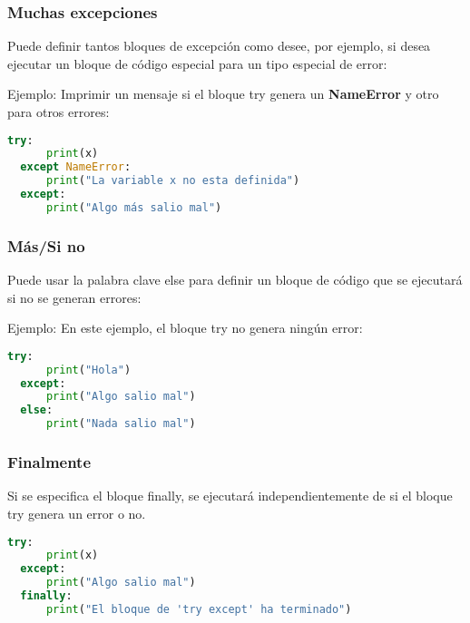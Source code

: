 \begin{frame}[fragile]
  \frametitle{Muchas excepciones}

  Puede definir tantos bloques de excepción como desee, por ejemplo,
  si desea ejecutar un bloque de código especial para un tipo especial
  de error:

  \vspace{\baselineskip}
  Ejemplo: Imprimir un mensaje si el bloque try genera un
  \textbf{NameError} y otro para otros errores:
  \begin{lstlisting}[language=Python]
  try:
      print(x)
  except NameError:
      print("La variable x no esta definida")
  except:
      print("Algo más salio mal") 
  \end{lstlisting}
\end{frame}

\begin{frame}[fragile]
  \frametitle{Más/Si no}

  Puede usar la palabra clave \textcolor{codeKeyword2}{else}
  para definir un bloque de código que se ejecutará si no se generan errores:

  \vspace{\baselineskip}
  Ejemplo: En este ejemplo, el bloque \textcolor{codeKeyword2}{try}
  no genera ningún error:
  \begin{lstlisting}[language=Python]
  try:
      print("Hola")
  except:
      print("Algo salio mal") 
  else:
      print("Nada salio mal") 
  \end{lstlisting}
\end{frame}

\begin{frame}[fragile]
  \frametitle{Finalmente}

  Si se especifica el bloque \textcolor{codeKeyword2}{finally}, se ejecutará
  independientemente de si el bloque try genera un error o no.

  \vspace{\baselineskip}
  \begin{lstlisting}[language=Python]
  try:
      print(x)
  except:
      print("Algo salio mal") 
  finally:
      print("El bloque de 'try except' ha terminado") 
  \end{lstlisting}
\end{frame}

